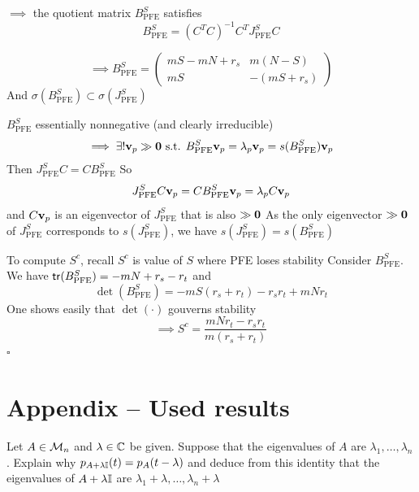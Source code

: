 \documentclass[aspectratio=169]{beamer}
\renewcommand{\thetheorem}{8.\arabic{theorem}}
\begin{document}
\begin{frame}
	$\implies$ the quotient matrix $B_{\textrm{PFE}}^S$ satisfies
\[
B_{\textrm{PFE}}^S = (C^TC)^{-1}C^TJ_{\textrm{PFE}}^SC
\label{eq:formulaJPPB}
\]

\[
\implies B_{\textrm{PFE}}^S = \begin{pmatrix}
mS - mN +r_s & m(N-S) \\
mS & -(mS + r_s)
\end{pmatrix}
\]
\vfill
And $\sigma(B_{\textrm{PFE}}^S) \subset \sigma(J_{\textrm{PFE}}^S)$
\end{frame}

\begin{frame}
	$B_{\textrm{PFE}}^S$ essentially nonnegative (and clearly irreducible)
	\[
	\implies\exists! \bv_p\gg \b0 
	\textrm{ s.t. }  B_{\textrm{PFE}}^S\bv_p = \lambda_p \bv_p=s(B_{\textrm{PFE}}^S)\bv_p
	\]
	\vfill 
	Then $J_{\textrm{PFE}}^SC=CB_{\textrm{PFE}}^S$
	\vfill
	So
	\begin{equation*}
		J_{\textrm{PFE}}^SC\mathbf{v}_p = CB_{\textrm{PFE}}^S\mathbf{v}_p = \lambda_p C \mathbf{v}_p
	\end{equation*}
	and $C\mathbf{v}_p$ is an eigenvector of $J_{\textrm{PFE}}^S$ that is also $\gg\b0$
	\vfill
	As the only eigenvector $\gg\b0$ of $J_{\textrm{PFE}}^S$ corresponds to $s(J_{\textrm{PFE}}^S)$, we have $s(J_{\textrm{PFE}}^S) = s(B_{\textrm{PFE}}^S)$ 
\end{frame}

\begin{frame}	
	To compute $S^c$, recall $S^c$ is value of $S$ where PFE loses stability
	\vfill
	Consider $B_{\textrm{PFE}}^S$. We have $\mathsf{tr}(B_{\textrm{PFE}}^S) = -mN +r_s-r_t$ and
	\[
		\det(B_{\textrm{PFE}}^S) = -mS(r_s+r_t) - r_sr_t  + mNr_t
	\]
	\vfill
	One shows easily that $\det(\cdot)$ gouverns stability
	\vfill
	\[
		\implies S^c = \frac{mNr_t-r_sr_t}{m(r_s+r_t)}
	\]
	\flushright$\square$
\end{frame}


\appendix
\section{Appendix -- Used results}
\setcounter{theorem}{0}
\renewcommand{\thetheorem}{A.\arabic{theorem}}

\begin{frame}{\cite{HornJohnson2013}}
	\begin{theorem}
		\label{th:HJ_problem_1_2_P8}
		Let $A\in\mathcal{M}_n$ and $\lambda\in\mathbb{C}$ be given. 
		Suppose that the eigenvalues of $A$ are $\lambda_1,\ldots,\lambda_n$.
		Explain why $p_{A+\lambda\mathbb{I}}(t)=p_A(t-\lambda)$ and deduce from this identity that the eigenvalues of $A+\lambda\mathbb{I}$ are $\lambda_1+\lambda,\ldots,\lambda_n+\lambda$
	\end{theorem}
\end{frame}
\end{document}
